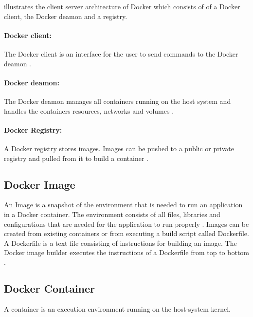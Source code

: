  illustrates the client server architecture of Docker which consists of of a Docker client, the Docker deamon and a registry.


\paragraph{Docker client:} The Docker client is an interface for the user to send commands to the Docker deamon \cite{Docker2020Docs}.


\paragraph{Docker deamon:} The Docker deamon manages all containers running on the host system and handles the containers resources, networks and volumes \cite{Bullington2020Docker}.


\paragraph{Docker Registry:} A Docker registry stores images. Images can be pushed to a public or private registry and pulled from it to build a container \cite{Docker2020Docs}.


\subsection{Docker Image}
\label{subsec:04_docker_image}
An Image is a snapshot of the environment that is needed to run an application in a Docker container. The environment consists of all files, libraries and configurations that are needed for the application to run properly \cite{Docker2020Docs, Nickoloff2019Docker}.
Images can be created from existing containers or from executing a build script called Dockerfile. A Dockerfile is a text file consisting of instructions for building an image. The Docker image builder executes the instructions of a Dockerfile from top to bottom \cite{Nickoloff2019Docker}.


\subsection{Docker Container}
A container is an execution environment running on the host-system kernel.

